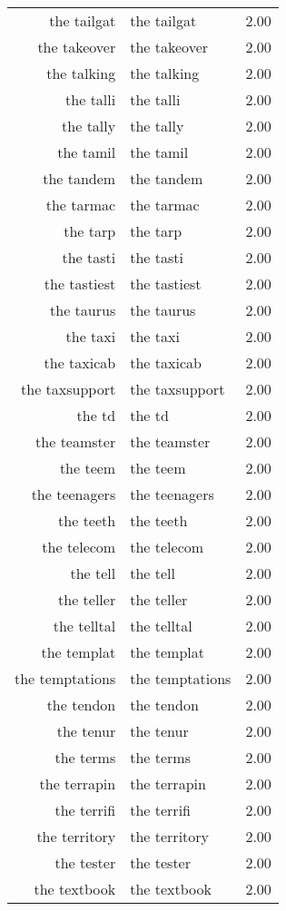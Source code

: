 \begin{table}[ht]
\begin{tabular}{rlr}
  the tailgat & the tailgat & 2.00 \\ 
  the takeover & the takeover & 2.00 \\ 
  the talking & the talking & 2.00 \\ 
  the talli & the talli & 2.00 \\ 
  the tally & the tally & 2.00 \\ 
  the tamil & the tamil & 2.00 \\ 
  the tandem & the tandem & 2.00 \\ 
  the tarmac & the tarmac & 2.00 \\ 
  the tarp & the tarp & 2.00 \\ 
  the tasti & the tasti & 2.00 \\ 
  the tastiest & the tastiest & 2.00 \\ 
  the taurus & the taurus & 2.00 \\ 
  the taxi & the taxi & 2.00 \\ 
  the taxicab & the taxicab & 2.00 \\ 
  the taxsupport & the taxsupport & 2.00 \\ 
  the td & the td & 2.00 \\ 
  the teamster & the teamster & 2.00 \\ 
  the teem & the teem & 2.00 \\ 
  the teenagers & the teenagers & 2.00 \\ 
  the teeth & the teeth & 2.00 \\ 
  the telecom & the telecom & 2.00 \\ 
  the tell & the tell & 2.00 \\ 
  the teller & the teller & 2.00 \\ 
  the telltal & the telltal & 2.00 \\ 
  the templat & the templat & 2.00 \\ 
  the temptations & the temptations & 2.00 \\ 
  the tendon & the tendon & 2.00 \\ 
  the tenur & the tenur & 2.00 \\ 
  the terms & the terms & 2.00 \\ 
  the terrapin & the terrapin & 2.00 \\ 
  the terrifi & the terrifi & 2.00 \\ 
  the territory & the territory & 2.00 \\ 
  the tester & the tester & 2.00 \\ 
  the textbook & the textbook & 2.00 \\ 

\end{tabular}
\end{table}
